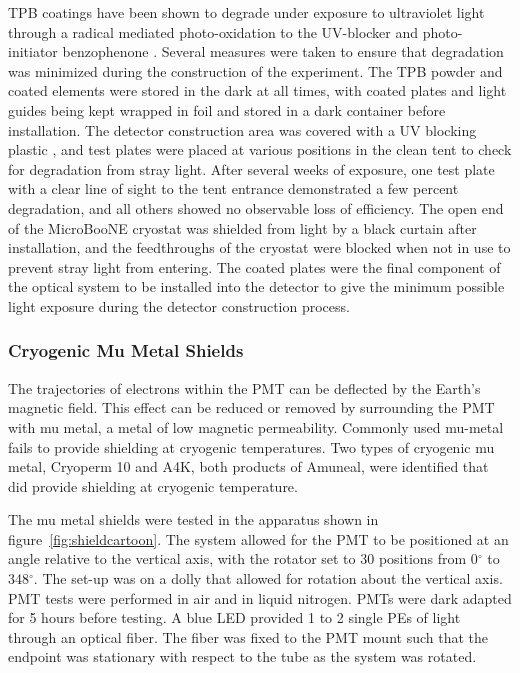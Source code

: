 TPB coatings have been shown to degrade under exposure to ultraviolet light \cite{Chiu:2012} through a radical mediated photo-oxidation to the UV-blocker and photo-initiator benzophenone \cite{Jones:2013}.  Several measures were taken to ensure that degradation was minimized during the construction of the experiment.  The TPB powder and coated elements were stored in the dark at all times, with coated plates and light guides being kept wrapped in foil and stored in a dark container before installation.  The detector construction area was covered with a UV blocking plastic \cite{LexanThermoclear}, and test plates were placed at various positions in the clean tent to check for degradation from stray light.  After several weeks of exposure, one test plate with a clear line of sight to the tent entrance demonstrated a few percent degradation, and all others showed no observable loss of efficiency. The open end of the MicroBooNE cryostat was shielded from light by a black curtain after installation, and the feedthroughs of the cryostat were blocked when not in use to prevent stray light from entering.  The coated plates were the final component of the optical system to be installed into the detector to give the minimum possible light exposure during the detector construction process.

\subsubsection{Cryogenic Mu Metal Shields}







The trajectories of electrons within the PMT can be deflected by the Earth's magnetic field.  This effect can be reduced or removed by surrounding the PMT with mu metal, a metal of low magnetic permeability.  Commonly used mu-metal fails to provide shielding at cryogenic temperatures. Two types of cryogenic mu metal, Cryoperm 10 and A4K, both products of Amuneal, were identified that did provide shielding at cryogenic temperature. 

The mu metal shields were tested in the apparatus shown in figure~\ref{fig:shieldcartoon}.  The system allowed for the PMT to be positioned at an angle relative to the vertical axis, with the rotator set to 30 positions from 0$^{\circ}$ to 348$^\circ$.    The set-up was on a dolly that allowed for rotation about the vertical axis.  PMT tests were performed in air and in liquid nitrogen.   PMTs were dark adapted for 5 hours before testing.  %
A blue LED provided 1 to 2 single PEs of light through an optical fiber.   The fiber was fixed to the PMT mount such that the endpoint was stationary with respect to the tube as the system was rotated.   

